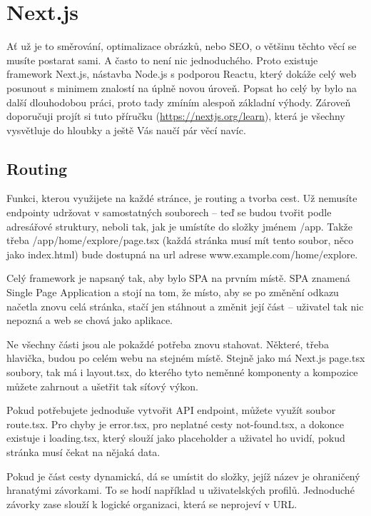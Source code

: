 \section{Next.js}

Ať už je to směrování, optimalizace obrázků, nebo SEO, o většinu těchto věcí se musíte postarat sami. A často to není nic jednoduchého. Proto existuje framework Next.js\cite{NextJSDocs}, nástavba Node.js s podporou Reactu, který dokáže celý web posunout s minimem znalostí na úplně novou úroveň. Popsat ho celý by bylo na další dlouhodobou práci, proto tady zmíním alespoň základní výhody. Zároveň doporučuji projít si tuto příručku (\href{https://nextjs.org/learn}{https://nextjs.org/learn})\cite{NextJSLearn}, která je všechny vysvětluje do hloubky a ještě Vás naučí pár věcí navíc.

\subsection*{Routing}

Funkci, kterou využijete na každé stránce, je routing a tvorba cest. Už nemusíte endpointy udržovat v samostatných souborech – teď se budou tvořit podle adresářové struktury, neboli tak, jak je umístíte do složky jménem /app. Takže třeba /app/home/explore/page.tsx (každá stránka musí mít tento soubor, něco jako index.html) bude dostupná na url adrese www.example.com/home/explore.

Celý framework je napsaný tak, aby bylo SPA na prvním místě. SPA znamená Single Page Application a stojí na tom, že místo, aby se po změnění odkazu načetla znovu celá stránka, stačí jen stáhnout a změnit její část – uživatel tak nic nepozná a web se chová jako aplikace.

Ne všechny části jsou ale pokaždé potřeba znovu stahovat. Některé, třeba hlavička, budou po celém webu na stejném místě. Stejně jako má Next.js page.tsx soubory, tak má i layout.tsx, do kterého tyto neměnné komponenty a kompozice můžete zahrnout a ušetřit tak síťový výkon.

Pokud potřebujete jednoduše vytvořit API endpoint, můžete využít soubor route.tsx. Pro chyby je error.tsx, pro neplatné cesty not-found.tsx, a dokonce existuje i loading.tsx, který slouží jako placeholder a uživatel ho uvidí, pokud stránka musí čekat na nějaká data.

Pokud je část cesty dynamická, dá se umístit do složky, jejíž název je ohraničený hranatými závorkami. To se hodí například u uživatelských profilů. Jednoduché závorky zase slouží k logické organizaci, která se neprojeví v URL.

